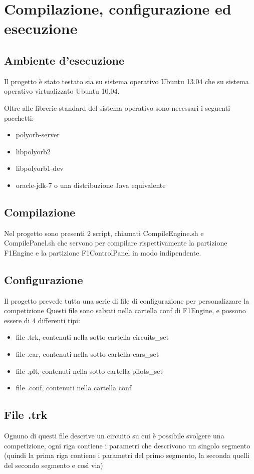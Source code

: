 \documentclass[a4paper,11pt, twoside, openright]{book}
\begin{document}
  \chapter{Compilazione, configurazione ed esecuzione}
    \section{Ambiente d'esecuzione}
      Il progetto è stato testato sia su sistema operativo Ubuntu 13.04 che su sistema operativo virtualizzato Ubuntu 10.04.
      
      Oltre alle librerie standard del sistema operativo sono necessari i seguenti pacchetti:
      \begin{itemize}
        \item polyorb-server
	\item libpolyorb2
	\item libpolyorb1-dev
	\item oracle-jdk-7 o una distribuzione Java equivalente
      \end{itemize}

    \section{Compilazione}
      Nel progetto sono presenti 2 script, chiamati CompileEngine.sh e CompilePanel.sh
      che servono per compilare rispettivamente la partizione F1Engine e la partizione F1ControlPanel
      in modo indipendente.
      
    \section{Configurazione}
      Il progetto prevede tutta una serie di file di configurazione per personalizzare la competizione
      Questi file sono salvati nella cartella conf di F1Engine, e possono essere di 4 differenti tipi:
      
      \begin{itemize}
	\item file .trk, contenuti nella sotto cartella circuits\_set 
	\item file .car, contenuti nella sotto cartella cars\_set
	\item file .plt, contenuti nella sotto cartella pilots\_set
	\item file .conf, contenuti nella cartella conf
      \end{itemize}
      
      \section{File .trk}
	Ognuno di questi file descrive un circuito su cui è possibile svolgere una competizione, ogni riga contiene i parametri
	che descrivono un singolo segmento (quindi la prima riga contiene i parametri del primo segmento, la seconda
	quelli del secondo segmento e così via)
	
\end{document}
